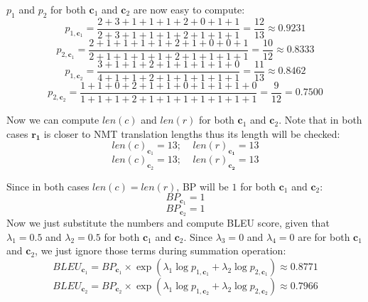 \begin{parts}
{\begin{enumerate}[i.]
    $p_1$ and $p_2$ for both $\mathbf{c}_1$ and $\mathbf{c}_2$ are now easy to compute:
    \begin{equation}
        p_{1, \mathbf{c}_1} = \frac{2+3+1+1+1+2+0+1+1}{2+3+1+1+1+2+1+1+1} = \frac{12}{13} \approx 0.9231
    \end{equation}
    \begin{equation}
        p_{2, \mathbf{c}_1} = \frac{2+1+1+1+1+2+1+0+0+1}{2+1+1+1+1+2+1+1+1+1} = \frac{10}{12} \approx 0.8333
    \end{equation}
    \begin{equation}
        p_{1, \mathbf{c}_2} = \frac{3+1+1+2+1+1+1+1+0}{4+1+1+2+1+1+1+1+1} = \frac{11}{13} \approx 0.8462
    \end{equation}
    \begin{equation}
        p_{2, \mathbf{c}_2} = \frac{1+1+0+2+1+1+0+1+1+1+0}{1+1+1+2+1+1+1+1+1+1+1} = \frac{9}{12} = 0.7500
    \end{equation}
    
    Now we can compute $len(c)$ and $len(r)$ for both $\mathbf{c}_1$ and $\mathbf{c}_2$. Note that in both cases $\mathbf{r_1}$ is closer to NMT translation lengths thus its length will be checked:
    \begin{equation}
        len(c)_{\mathbf{c}_1}=13;\ \text{ }\ len(r)_{\mathbf{c_1}}=13
    \end{equation}
    \begin{equation}
        len(c)_{\mathbf{c}_2}=13;\ \text{ }\ len(r)_{\mathbf{c_2}}=13
    \end{equation}
    
    Since in both cases $len(c)=len(r)$, BP will be $1$ for both $\mathbf{c}_1$ and $\mathbf{c}_2$:
    \begin{equation}
        BP_{\mathbf{c}_1}=1
    \end{equation}
    \begin{equation}
        BP_{\mathbf{c}_2}=1
    \end{equation}
    Now we just substitute the numbers and compute BLEU score, given that $\lambda_1=0.5$ and $\lambda_2=0.5$ for both $\mathbf{c}_1$ and $\mathbf{c}_2$. Since $\lambda_3=0$ and $\lambda_4=0$ are for both $\mathbf{c}_1$ and $\mathbf{c}_2$, we just ignore those terms during summation operation:
    \begin{equation}
        BLEU_{\mathbf{c}_1}=BP_{\mathbf{c}_1}\times\exp\left(\lambda_1\log p_{1, \mathbf{c}_1}+\lambda_2\log p_{2, \mathbf{c}_1}\right)\approx 0.8771
    \end{equation}
    \begin{equation}
        BLEU_{\mathbf{c}_2}=BP_{\mathbf{c}_2}\times\exp\left(\lambda_1\log p_{1, \mathbf{c}_2}+\lambda_2\log p_{2, \mathbf{c}_2}\right)\approx 0.7966
    \end{equation}
    

\end{enumerate}}
\end{parts}
